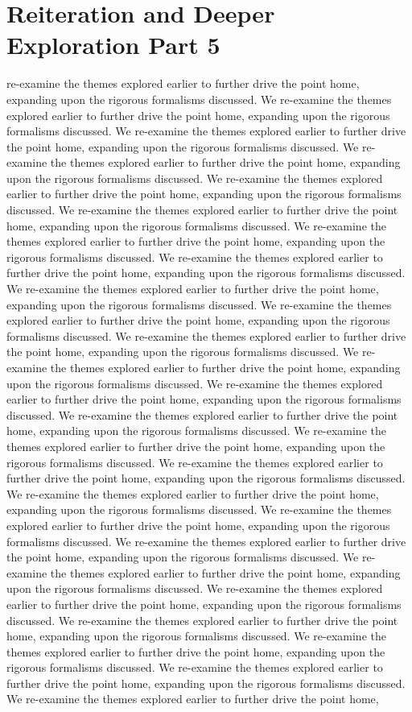 \section{Reiteration and Deeper Exploration Part 5}\nWe re-examine the themes explored earlier to further drive the point home, expanding upon the rigorous formalisms discussed. We re-examine the themes explored earlier to further drive the point home, expanding upon the rigorous formalisms discussed. We re-examine the themes explored earlier to further drive the point home, expanding upon the rigorous formalisms discussed. We re-examine the themes explored earlier to further drive the point home, expanding upon the rigorous formalisms discussed. We re-examine the themes explored earlier to further drive the point home, expanding upon the rigorous formalisms discussed. We re-examine the themes explored earlier to further drive the point home, expanding upon the rigorous formalisms discussed. We re-examine the themes explored earlier to further drive the point home, expanding upon the rigorous formalisms discussed. We re-examine the themes explored earlier to further drive the point home, expanding upon the rigorous formalisms discussed. We re-examine the themes explored earlier to further drive the point home, expanding upon the rigorous formalisms discussed. We re-examine the themes explored earlier to further drive the point home, expanding upon the rigorous formalisms discussed. We re-examine the themes explored earlier to further drive the point home, expanding upon the rigorous formalisms discussed. We re-examine the themes explored earlier to further drive the point home, expanding upon the rigorous formalisms discussed. We re-examine the themes explored earlier to further drive the point home, expanding upon the rigorous formalisms discussed. We re-examine the themes explored earlier to further drive the point home, expanding upon the rigorous formalisms discussed. We re-examine the themes explored earlier to further drive the point home, expanding upon the rigorous formalisms discussed. We re-examine the themes explored earlier to further drive the point home, expanding upon the rigorous formalisms discussed. We re-examine the themes explored earlier to further drive the point home, expanding upon the rigorous formalisms discussed. We re-examine the themes explored earlier to further drive the point home, expanding upon the rigorous formalisms discussed. We re-examine the themes explored earlier to further drive the point home, expanding upon the rigorous formalisms discussed. We re-examine the themes explored earlier to further drive the point home, expanding upon the rigorous formalisms discussed. We re-examine the themes explored earlier to further drive the point home, expanding upon the rigorous formalisms discussed. We re-examine the themes explored earlier to further drive the point home, expanding upon the rigorous formalisms discussed. We re-examine the themes explored earlier to further drive the point home, expanding upon the rigorous formalisms discussed. We re-examine the themes explored earlier to further drive the point home, expanding upon the rigorous formalisms discussed. We re-examine the themes explored earlier to further drive the point home, 